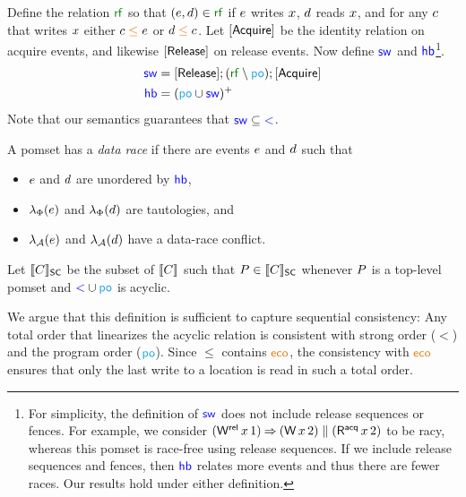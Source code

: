 Define the relation ${\rrfx}$ so that $(\aEv,\bEv)\in{\rrfx}$ if $e$
writes $x$, $d$ reads $x$, and for any $c$ that writes $x$
either $\cEv\gtN\aEv$ or $\bEv\gtN\cEv$.  Let $[\mathsf{Acquire}]$ be the identity
relation on acquire events, and likewise $[\mathsf{Release}]$ on release events.  Now
define $\mathrel{\color{blue}\mathsf{sw}}$ and $\mathrel{\color{blue}\mathsf{hb}}$\footnote{For simplicity, the definition of $\mathrel{\color{blue}\mathsf{sw}}$
  does not include release sequences or fences.  For example, we consider
  \begin{math}
    (\DWRel{x}{1})\prefix(\DW{x}{2}) \parallel (\DRAcq{x}{2})
  \end{math}
  to be racy, whereas this pomset is race-free using release sequences.  If
  we include release sequences and fences, then $\mathrel{\color{blue}\mathsf{hb}}$ relates more events
  and thus there are fewer races. Our results hold under either definition.}.
\begin{align*}
  {\rsw} &= \IDRel; ({\rrfx}\setminus{\rpox}); \IDAcq
  \\
  {\rhb} &= ({\rpox} \cup {\rsw})^+
\end{align*}
Note that our semantics guarantees that ${\mathrel{\color{blue}\mathsf{sw}}}\subseteq{\mathrel{{\color{blue}<}}}$.

A pomset has a \emph{data race} if there are events $e$ and $d$ such
that
\begin{itemize}
\item $e$ and $d$ are unordered by $\mathrel{\color{blue}\mathsf{hb}}$,
\item $\lambda_{\Phi}(e)$ and $\lambda_{\Phi}(d)$ are tautologies, and
\item $\lambda_{\mathcal{A}}(e)$ and $\lambda_{\mathcal{A}}(d)$ have a data-race conflict.
\end{itemize}

\begin{definition}
  Let $\llbracket C\rrbracket_{\mathsf{SC}}$ be the subset of $\llbracket C\rrbracket$ such that
  $P\in\llbracket C\rrbracket_{\mathsf{SC}}$ whenever $P$ is a top-level pomset and ${\lt}\cup{\rpox}$ is acyclic.
\end{definition}
We argue that this definition is sufficient to capture sequential
consistency: Any total order that linearizes the acyclic relation is
consistent with strong order ($\lt$) and the program order ($\rpox$).  Since $\le$ contains $\reco$, the consistency with $\reco$ ensures that only the last write to a location is
read in such a total order.

